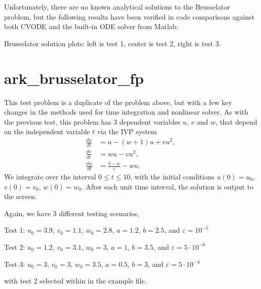 \documentclass[letterpaper,10pt,english]{sphinxmanual}
\begin{document}
Unfortunately, there are no known analytical solutions to the
Brusselator problem, but the following results have been verified
in code comparisons against both CVODE and the built-in ODE solver
 from Matlab:

\noindent{}

\noindent{}

\noindent{}

Brusselator solution plots: left is test 1, center is test 2, right is
test 3.


\section{ark\_brusselator\_fp}
\label{\detokenize{c_serial:id8}}\label{\detokenize{c_serial:ark-brusselator-fp}}
This test problem is a duplicate of the  problem
above, but with a few key changes in the methods used for time
integration and nonlinear solver.  As with the previous test, this
problem has 3 dependent variables \(u\), \(v\) and \(w\),
that depend on the independent variable \(t\) via the IVP system
\begin{equation*}
\begin{split}\frac{du}{dt} &= a - (w+1)u + v u^2, \\
\frac{dv}{dt} &= w u - v u^2, \\
\frac{dw}{dt} &= \frac{b-w}{\varepsilon} - w u.\end{split}
\end{equation*}
We integrate over the interval \(0 \le t \le 10\), with the
initial conditions \(u(0) = u_0\), \(v(0) = v_0\),
\(w(0) = w_0\).  After each unit time interval, the solution is
output to the screen.

Again, we have 3 different testing scenarios,

Test 1:  \(u_0=3.9\),  \(v_0=1.1\),  \(w_0=2.8\),
\(a=1.2\), \(b=2.5\), and \(\varepsilon=10^{-5}\)

Test 2:  \(u_0=1.2\), \(v_0=3.1\), \(w_0=3\), \(a=1\),
\(b=3.5\), and \(\varepsilon=5\cdot10^{-6}\)

Test 3:  \(u_0=3\), \(v_0=3\), \(w_0=3.5\), \(a=0.5\),
\(b=3\), and \(\varepsilon=5\cdot10^{-4}\)

with test 2 selected within in the example file.
\end{document}
